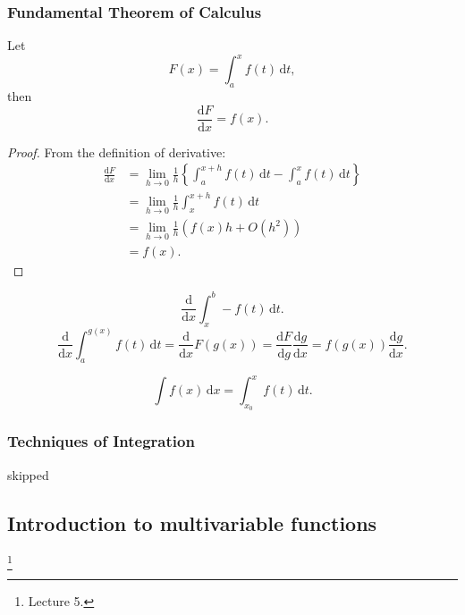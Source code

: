 \documentclass[a4paper]{article}
\begin{document}
    \subsubsection{Fundamental Theorem of Calculus}
    \begin{theorem}[FTC]\label{thm:ftc}
        Let
        \[
            F(x) = \int_{a}^{x} f(t) \,\mathrm{d}t
        ,\]
        then
        \[
            \frac{\mathrm{d}F}{\mathrm{d}x} = f(x) 
        .\]
    \end{theorem}
    \begin{proof}
        From the definition of derivative:
        \[
            \begin{aligned}
                 \frac{\mathrm{d}F}{\mathrm{d}x} &= \lim_{h \to 0} \frac{1}{h} \left\{ \int_{a}^{x+h} f(t) \,\mathrm{d}t - \int_{a}^{x} f(t) \,\mathrm{d}t\right\}\\
                 &= \lim_{h \to 0} \frac{1}{h} \int_{x}^{x+h} f(t) \,\mathrm{d}t\\
                 &= \lim_{h \to 0} \frac{1}{h}\left( f(x)h+O(h^2) \right)\\
                 &= f(x).
            \end{aligned}
        \]
    \end{proof}
    \begin{corollary}\label{col:ftc}
            \[
                \frac{\mathrm{d}}{\mathrm{d}x}\int_{x}^{b} -f(t) \,\mathrm{d}t 
            .\]
            \[
                \frac{\mathrm{d}}{\mathrm{d}x} \int_{a}^{g(x)} f(t) \,\mathrm{d}t = \frac{\mathrm{d}}{\mathrm{d}x}F(g(x)) = \frac{\mathrm{d}F}{\mathrm{d}g} \frac{\mathrm{d}g}{\mathrm{d}x} = f(g(x))\frac{\mathrm{d}g}{\mathrm{d}x}   
            .\]
    \end{corollary}
    \begin{definition}
        \[
            \int f(x) \,\mathrm{d}x = \int_{x_0}^{x} f(t) \,\mathrm{d}t
        .\]
    \end{definition}
    \subsubsection{Techniques of Integration}
    skipped
    \subsection{Introduction to multivariable functions}\footnote{Lecture 5.}
\end{document}
